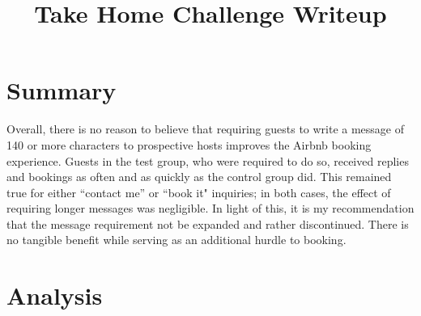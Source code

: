 \documentclass[11pt]{article}
\theoremstyle{definition}
\begin{document}
\title{Take Home Challenge Writeup}
\maketitle

\section{Summary}
Overall, there is no reason to believe that requiring guests to write a message of 140 or more characters to prospective hosts improves the Airbnb booking experience. Guests in the test group, who were required to do so, received replies and bookings as often and as quickly as the control group did. This remained true for either ``contact me'' or ``book it" inquiries; in both cases, the effect of requiring longer messages was negligible. In light of this, it is my recommendation that the message requirement not be expanded and rather discontinued. There is no tangible benefit while serving as an additional hurdle to booking.  

\section{Analysis}
\end{document}
